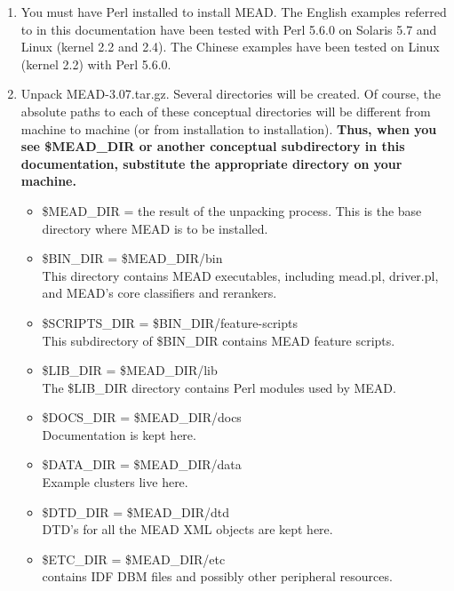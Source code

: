 \documentclass[10pt]{article}
\begin{document}
\begin{enumerate}

\item You must have Perl installed to install MEAD. 
The English examples referred
to in this documentation have been tested with Perl 5.6.0 on Solaris
5.7 and Linux (kernel 2.2 and 2.4).  The Chinese examples have been
tested on Linux (kernel 2.2) with Perl 5.6.0.

\item Unpack MEAD-3.07.tar.gz.  Several directories will be created.
Of course, the absolute paths to each of these conceptual directories
will be different from machine to machine (or from installation to
installation).  
{\bf Thus, when you see \$MEAD\_DIR or another conceptual
subdirectory in this documentation,
substitute the appropriate directory on your machine.}

\begin {itemize}

\item \$MEAD\_DIR = the result of the unpacking process.  This is the
base directory where MEAD is to be installed.

\item \$BIN\_DIR = \$MEAD\_DIR/bin\\
This directory contains MEAD executables, including mead.pl,
driver.pl, and MEAD's core classifiers and rerankers.

\item \$SCRIPTS\_DIR  = \$BIN\_DIR/feature-scripts\\
This subdirectory of \$BIN\_DIR contains MEAD feature scripts.

\item \$LIB\_DIR = \$MEAD\_DIR/lib\\
The \$LIB\_DIR directory contains Perl modules used by MEAD.

\item \$DOCS\_DIR    = \$MEAD\_DIR/docs\\
Documentation is kept here.

\item \$DATA\_DIR    = \$MEAD\_DIR/data\\
Example clusters live here.

\item \$DTD\_DIR     = \$MEAD\_DIR/dtd\\
DTD's for all the MEAD XML objects are kept here.

\item \$ETC\_DIR     = \$MEAD\_DIR/etc\\
contains IDF DBM files and possibly other peripheral resources.


\end{itemize}
\end{enumerate}
\end{document}
